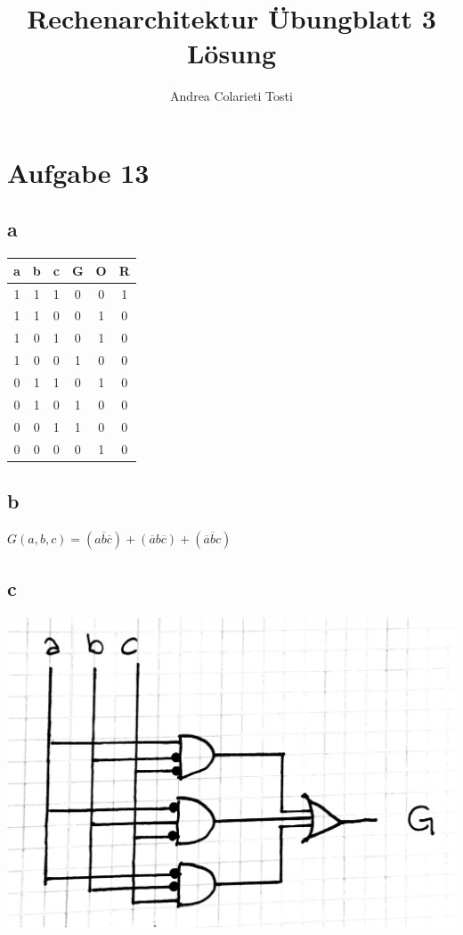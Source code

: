 \documentclass[12pt,a4paper]{article}
\author{Andrea Colarieti Tosti}
\title{Rechenarchitektur Übungblatt 3 Lösung}
\begin{document}
\maketitle
\newpage

\section{Aufgabe 13}
\subsection{a}

\begin{tabular}{|c|c|c||c|c|c|}
\hline
a & b & c & G & O & R \\
\hline
1	&	1	&	1	&	0	&	0	&	1	\\
\hline
1	&	1	&	0	&	0	&	1	&	0	\\
\hline
1	&	0	&	1	&	0	&	1	&	0	\\
\hline
1	&	0	&	0	&	1	&	0	&	0	\\
\hline
0	&	1	&	1	&	0	&	1	&	0	\\
\hline
0	&	1	&	0	&	1	&	0	&	0	\\
\hline
0	&	0	&	1	&	1	&	0	&	0	\\
\hline
0	&	0	&	0	&	0	&	1	&	0	\\
\hline
\end{tabular}

\subsection{b}
$ G(a,b,c)= (a\overline{b}\overline{c})+(\overline{a}b\overline{c})+(\overline{a}\overline{b}c)$
\subsection{c}
\includegraphics[scale=0.21]{a.jpg} 
\end{document}
